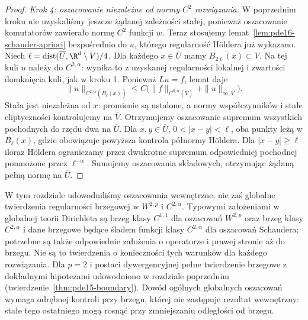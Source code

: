 \begin{proof}
\emph{Krok 4: oszacowanie niezależne od normy $C^2$ rozwiązania.}
W poprzednim kroku nie uzyskaliśmy jeszcze żądanej
zależności stałej, ponieważ oszacowanie komutatorów
zawierało normę $C^2$ funkcji $w$.
Teraz stosujemy lemat~\ref{lem:pde16-schauder-apriori}
bezpośrednio do $u$, którego regularność Höldera
już wykazano. Niech
$\ell=\operatorname{dist}(\overline U,\R^d\setminus V)/4$.
Dla każdego $x\in\overline U$ mamy
$\overline{B_{2\ell}(x)}\subset V$.
Na tej kuli $u$ należy do $C^{2,\alpha}$:
wynika to z uzyskanej regularności lokalnej
i zwartości domknięcia kuli, jak w kroku 1.
Ponieważ $Lu=f$, lemat daje
\[
 \|u\|_{C^{2,\alpha}(\overline{B_\ell(x)})}
 \le C\bigl(\|f\|_{C^{0,\alpha}(\overline V)}
                 +\|u\|_{\infty,V}\bigr).
\]
Stała jest niezależna od $x$: promienie są ustalone,
a normy współczynników i stałe eliptyczności
kontrolujemy na $\overline V$.
Otrzymujemy oszacowanie supremum wszystkich pochodnych
do rzędu dwa na $\overline U$.
Dla $x,y\in\overline U$, $0<|x-y|<\ell$, oba punkty
leżą w $B_\ell(x)$, gdzie obowiązuje powyższa
kontrola półnormy Höldera.
Dla $|x-y|\ge\ell$ iloraz Höldera ograniczamy
przez dwukrotne supremum odpowiedniej pochodnej
pomnożone przez $\ell^{-\alpha}$.
Sumujemy oszacowania składowych, otrzymując
żądaną pełną normę na $\overline U$.
\end{proof}

\begin{uwaga}
\label{rem:pde16-boundary}
W tym rozdziale udowodniliśmy oszacowania wewnętrzne,
nie zaś globalne twierdzenia regularności brzegowej
w $W^{2,p}$ i $C^{2,\alpha}$.
Typowymi założeniami w globalnej teorii Dirichleta
są brzeg klasy $C^{1,1}$ dla oszacowań $W^{2,p}$
oraz brzeg klasy $C^{2,\alpha}$ i dane brzegowe będące
śladem funkcji klasy $C^{2,\alpha}$ dla oszacowań
Schaudera; potrzebne są także odpowiednie założenia
o operatorze i prawej stronie aż do brzegu.
Nie są to twierdzenia o konieczności tych warunków
dla każdego rozwiązania.
Dla $p=2$ i postaci dywergencyjnej pełne twierdzenie
brzegowe z dokładnymi hipotezami udowodniono
w rozdziale poprzednim (twierdzenie~\ref{thm:pde15-boundary}).
Dowód ogólnych globalnych oszacowań wymaga odrębnej
kontroli przy brzegu, której nie zastępuje rezultat
wewnętrzny: stałe tego ostatniego mogą rosnąć
przy zmniejszaniu odległości od brzegu.
\end{uwaga}

